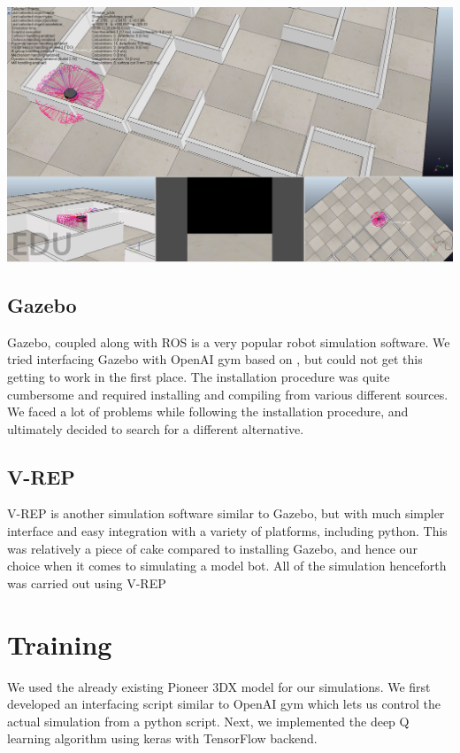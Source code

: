 \documentclass[12pt]{extreport}
\begin{document}
\begin{center}
    \includegraphics[width=0.8\linewidth]{3.png}
\end{center}


\subsection{Gazebo}
Gazebo, \cite{gazebo} coupled along with ROS \cite{ros} is a very popular robot simulation software. We tried interfacing Gazebo with OpenAI gym based on \cite{gym-gazebo}, but could not get this getting to work in the first place. The installation procedure was quite cumbersome and required installing and compiling from various different sources. We faced a lot of problems while following the installation procedure, and ultimately decided to search for a different alternative.

\subsection{V-REP}
V-REP \cite{v-rep} is another simulation software similar to Gazebo, but with much simpler interface and easy integration with a variety of platforms, including python. This was relatively a piece of cake compared to installing Gazebo, and hence our choice when it comes to simulating a model bot. All of the simulation henceforth was carried out using V-REP

\section{Training}

We used the already existing Pioneer 3DX model for our simulations. We first developed an interfacing script similar to OpenAI gym which lets us control the actual simulation from a python script. Next, we implemented the deep Q learning algorithm using keras with TensorFlow backend.
\end{document}

